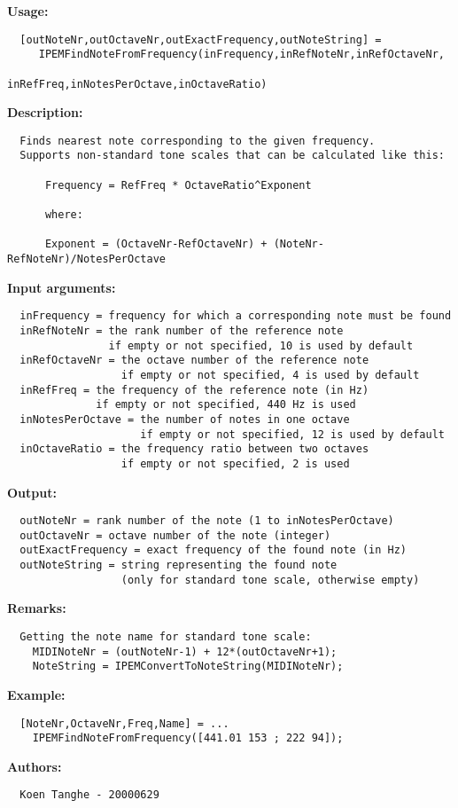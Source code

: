 \textbf{Usage:}
\begin{verbatim}  [outNoteNr,outOctaveNr,outExactFrequency,outNoteString] =
     IPEMFindNoteFromFrequency(inFrequency,inRefNoteNr,inRefOctaveNr,
                               inRefFreq,inNotesPerOctave,inOctaveRatio)

\end{verbatim}
\textbf{Description:}
\begin{verbatim}  Finds nearest note corresponding to the given frequency.
  Supports non-standard tone scales that can be calculated like this:

      Frequency = RefFreq * OctaveRatio^Exponent

      where:

      Exponent = (OctaveNr-RefOctaveNr) + (NoteNr-RefNoteNr)/NotesPerOctave 

\end{verbatim}
\textbf{Input arguments:}
\begin{verbatim}  inFrequency = frequency for which a corresponding note must be found
  inRefNoteNr = the rank number of the reference note
                if empty or not specified, 10 is used by default
  inRefOctaveNr = the octave number of the reference note
                  if empty or not specified, 4 is used by default
  inRefFreq = the frequency of the reference note (in Hz)
              if empty or not specified, 440 Hz is used
  inNotesPerOctave = the number of notes in one octave
                     if empty or not specified, 12 is used by default
  inOctaveRatio = the frequency ratio between two octaves
                  if empty or not specified, 2 is used

\end{verbatim}
\textbf{Output:}
\begin{verbatim}  outNoteNr = rank number of the note (1 to inNotesPerOctave)
  outOctaveNr = octave number of the note (integer)
  outExactFrequency = exact frequency of the found note (in Hz)
  outNoteString = string representing the found note
                  (only for standard tone scale, otherwise empty)

\end{verbatim}
\textbf{Remarks:}
\begin{verbatim}  Getting the note name for standard tone scale:
    MIDINoteNr = (outNoteNr-1) + 12*(outOctaveNr+1);
    NoteString = IPEMConvertToNoteString(MIDINoteNr);

\end{verbatim}
\textbf{Example:}
\begin{verbatim}  [NoteNr,OctaveNr,Freq,Name] = ...
    IPEMFindNoteFromFrequency([441.01 153 ; 222 94]);

\end{verbatim}
\textbf{Authors:}
\begin{verbatim}  Koen Tanghe - 20000629
\end{verbatim}


